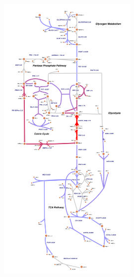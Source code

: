 \begin{figure}[!htbp]
    \centering
    \includegraphics[width=0.6\textwidth]{images/chap8/image02.png}
    \label{fig:ch802}
\end{figure}
\FloatBarrier

